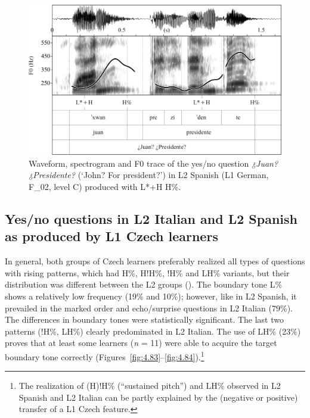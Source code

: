 \begin{figure}


\includegraphics[width=\textwidth]{figures/Figure_4.82.png}



\caption{Waveform, spectrogram and F0 trace of the yes/no question \textit{¿Juan? ¿Presidente?} (‘John? For president?’) in L2 Spanish (L1 German, F\_02, level C) produced with L*+H H\%.}
\label{fig:4.82}
\end{figure}

\subsection{Yes/no questions in L2 Italian and L2 Spanish as produced by L1 Czech learners}\label{sec:4.3.3}

In general, both groups of Czech learners preferably realized all types of questions with rising patterns, which had H\%, H!H\%, !H\% and LH\% variants, but their distribution was different between the L2 groups (). The boundary tone L\% shows a relatively low frequency (19\% and 10\%); however, like in L2 Spanish, it prevailed in the marked order and echo/surprise questions in L2 Italian (79\%). The differences in boundary tones were statistically significant. The last two patterns (!H\%, LH\%) clearly predominated in L2 Italian. The use of LH\% (23\%) proves that at least some learners (\textit{n} = 11) were able to acquire the target boundary tone correctly (Figures~\ref{fig:4.83}--\ref{fig:4.84}).\footnote{The realization of (H)!H\% (“sustained pitch”) and LH\% observed in L2 Spanish and L2 Italian can be partly explained by the (negative or positive) transfer of a L1 Czech feature.}

